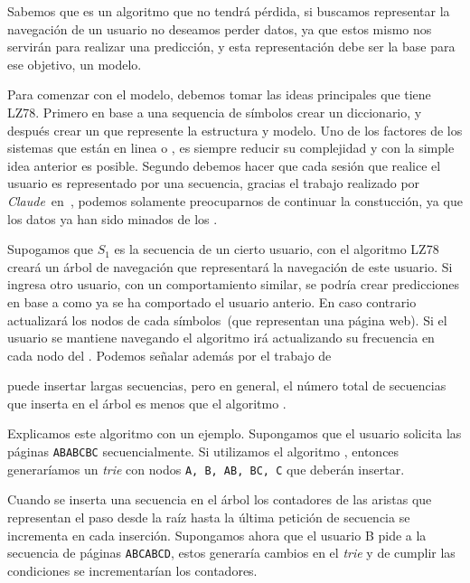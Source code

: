 % 

Sabemos que \lzSieteOcho es un algoritmo que no tendrá pérdida, si buscamos representar la navegación de un usuario no deseamos perder datos, ya que estos mismo nos servirán para realizar una predicción, y esta representación debe ser la base para ese objetivo, un modelo.

Para comenzar con el modelo, debemos tomar las ideas principales que tiene LZ78. Primero en base a una sequencia de símbolos crear un diccionario, y después crear un \trie que represente la estructura y modelo. Uno de los factores de los sistemas que están en linea o \webs, es siempre reducir su complejidad y con la simple idea anterior es posible. Segundo debemos hacer que cada sesión que realice el usuario es representado por una secuencia, gracias el trabajo realizado por \emph{Claude}~\etal en~\cite{Claude2014}, podemos solamente preocuparnos de continuar la constucción, ya que los datos ya han sido minados de los \webasccesslog.





Supogamos que $S_{1}$ es la secuencia de un cierto usuario, con el  algoritmo LZ78 creará un árbol de navegación que representará la navegación de este usuario. Si ingresa otro usuario, con un comportamiento similar, se podría crear predicciones en base a como ya se ha comportado el usuario anterio. En caso contrario actualizará los nodos de cada símbolos~(que  representan una página web). Si el usuario se mantiene navegando el algoritmo irá actualizando su frecuencia en cada nodo del \trie. Podemos señalar además por el trabajo de 


puede insertar largas secuencias, pero en general, el número total de secuencias que inserta en el árbol es menos que el algoritmo \PPM. 

Explicamos este algoritmo con un ejemplo. Supongamos que el usuario solicita las páginas \texttt{ABABCBC} secuencialmente. Si utilizamos el algoritmo \lzSieteOcho, entonces generaríamos un \emph{trie} con nodos  \texttt{A, B, AB, BC, C} que deberán insertar. 


Cuando se inserta una secuencia en el árbol los contadores de las aristas que representan el paso desde la raíz hasta la última petición de secuencia se incrementa en cada inserción. Supongamos ahora que el usuario B pide a la secuencia de páginas \texttt{ABCABCD}, estos generaría cambios en el \emph{trie} y de cumplir las condiciones se incrementarían los contadores. 


